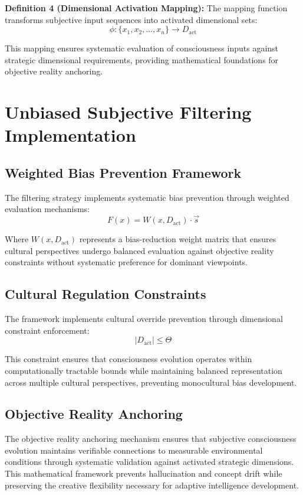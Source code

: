 \documentclass[12pt]{article}
\begin{document}
\textbf{Definition 4 (Dimensional Activation Mapping):} The mapping function transforms subjective input sequences into activated dimensional sets:
\[
\phi: \{x_1, x_2, \ldots, x_n\} \rightarrow D_{\text{act}}
\]

This mapping ensures systematic evaluation of consciousness inputs against strategic dimensional requirements, providing mathematical foundations for objective reality anchoring.

\section{Unbiased Subjective Filtering Implementation}

\subsection{Weighted Bias Prevention Framework}

The filtering strategy implements systematic bias prevention through weighted evaluation mechanisms:
\[
F(x) = W(x, D_{\text{act}}) \cdot \vec{s}
\]

Where $W(x, D_{\text{act}})$ represents a bias-reduction weight matrix that ensures cultural perspectives undergo balanced evaluation against objective reality constraints without systematic preference for dominant viewpoints.

\subsection{Cultural Regulation Constraints}

The framework implements cultural override prevention through dimensional constraint enforcement:
\[
|D_{\text{act}}| \leq \Theta
\]

This constraint ensures that consciousness evolution operates within computationally tractable bounds while maintaining balanced representation across multiple cultural perspectives, preventing monocultural bias development.

\subsection{Objective Reality Anchoring}

The objective reality anchoring mechanism ensures that subjective consciousness evolution maintains verifiable connections to measurable environmental conditions through systematic validation against activated strategic dimensions. This mathematical framework prevents hallucination and concept drift while preserving the creative flexibility necessary for adaptive intelligence development.
\end{document}
